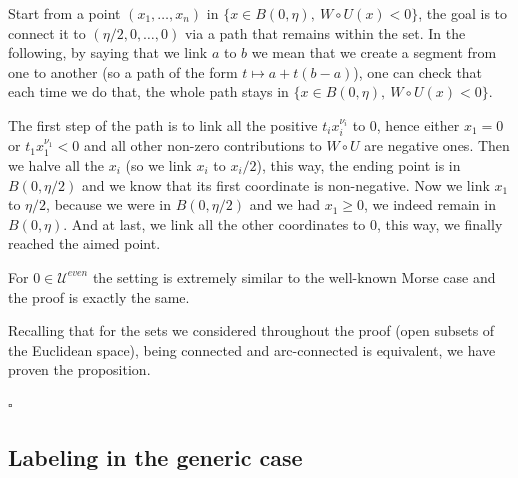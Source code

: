 \documentclass[12pt]{amsart}
\newcommand{\ep}{\hfill $\square$}
\numberwithin{equation}{section}
\numberwithin{figure}{section}
\def\uuu{{\mathcal U}}\def\vvv{{\mathcal V}}\def\www{{\mathcal W}}\def\xxx{{\mathcal X}}
\begin{document}
Start from a point $(x_1,\ldots,x_n)$ in $\{x\in B(0,\eta),\ W\circ U(x)<0\}$, the goal is to connect it to $(\eta/2,0,\ldots,0)$ via a path that remains within the set. In the following, by saying that we link $a$ to $b$ we mean that we create a segment from one to another (so a path of the form $t\mapsto a + t(b-a)$), one can check that each time we do that, the whole path stays in $\{x\in B(0,\eta),\ W\circ U(x)<0\}$.

The first step of the path is to link all the positive $t_ix_i^{\nu_i}$ to $0$, hence either $x_1=0$ or $t_1x_1^{\nu_1}<0$ and all other non-zero contributions to $W\circ U$ are negative ones. Then we halve all the $x_i$ (so we link $x_i$ to $x_i/2$), this way, the ending point is in $B(0,\eta/2)$ and we know that its first coordinate is non-negative. Now we link $x_1$ to $\eta/2$, because we were in $B(0,\eta/2)$ and we had $x_1\geq0$, we indeed remain in $B(0,\eta)$. And at last, we link all the other coordinates to $0$, this way, we finally reached the aimed point.

For $0\in\uuu^{even}$ the setting is extremely similar to the well-known Morse case and the proof is exactly the same.

Recalling that for the sets we considered throughout the proof (open subsets of the Euclidean space), being connected and arc-connected is equivalent, we have proven the proposition.

\ep











































\subsection{Labeling in the generic case}\label{sec:labeling}
\end{document}
